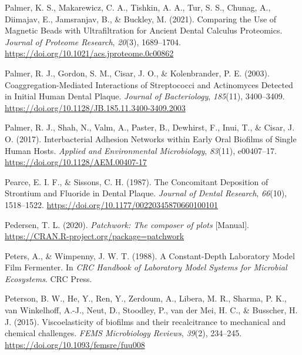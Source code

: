 \documentclass[
  letterpaper,
]{book}
\newlength{\cslhangindent}
\newlength{\cslentryspacingunit} %
\newenvironment{CSLReferences}[2] %
 {%
  \setlength{\parindent}{0pt}
  \ifodd #1
  \let\oldpar\par
  \def\par{\hangindent=\cslhangindent\oldpar}
  \fi
  \setlength{\parskip}{#2\cslentryspacingunit}
 }%
 {}
\begin{document}
\begin{CSLReferences}{1}{0}
\leavevmode{}%
Palmer, K. S., Makarewicz, C. A., Tishkin, A. A., Tur, S. S., Chunag,
A., Diimajav, E., Jamsranjav, B., \& Buckley, M. (2021). Comparing the
{Use} of {Magnetic Beads} with {Ultrafiltration} for {Ancient Dental
Calculus Proteomics}. \emph{Journal of Proteome Research}, \emph{20}(3),
1689--1704. \url{https://doi.org/10.1021/acs.jproteome.0c00862}

\leavevmode{}%
Palmer, R. J., Gordon, S. M., Cisar, J. O., \& Kolenbrander, P. E.
(2003). Coaggregation-{Mediated Interactions} of {Streptococci} and
{Actinomyces Detected} in {Initial Human Dental Plaque}. \emph{Journal
of Bacteriology}, \emph{185}(11), 3400--3409.
\url{https://doi.org/10.1128/JB.185.11.3400-3409.2003}

\leavevmode{}%
Palmer, R. J., Shah, N., Valm, A., Paster, B., Dewhirst, F., Inui, T.,
\& Cisar, J. O. (2017). Interbacterial {Adhesion Networks} within {Early
Oral Biofilms} of {Single Human Hosts}. \emph{Applied and Environmental
Microbiology}, \emph{83}(11), e00407--17.
\url{https://doi.org/10.1128/AEM.00407-17}

\leavevmode{}%
Pearce, E. I. F., \& Sissons, C. H. (1987). The {Concomitant Deposition}
of {Strontium} and {Fluoride} in {Dental Plaque}. \emph{Journal of
Dental Research}, \emph{66}(10), 1518--1522.
\url{https://doi.org/10.1177/00220345870660100101}

\leavevmode{}%
Pedersen, T. L. (2020). \emph{Patchwork: {The} composer of plots}
{[}Manual{]}. \url{https://CRAN.R-project.org/package=patchwork}

\leavevmode{}%
Peters, A., \& Wimpenny, J. W. T. (1988). A {Constant-Depth Laboratory
Model Film Fermenter}. In \emph{{CRC Handbook} of {Laboratory Model
Systems} for {Microbial Ecosystems}}. {CRC Press}.

\leavevmode{}%
Peterson, B. W., He, Y., Ren, Y., Zerdoum, A., Libera, M. R., Sharma, P.
K., van Winkelhoff, A.-J., Neut, D., Stoodley, P., van der Mei, H. C.,
\& Busscher, H. J. (2015). Viscoelasticity of biofilms and their
recalcitrance to mechanical and chemical challenges. \emph{FEMS
Microbiology Reviews}, \emph{39}(2), 234--245.
\url{https://doi.org/10.1093/femsre/fuu008}


\end{CSLReferences}
\end{document}
